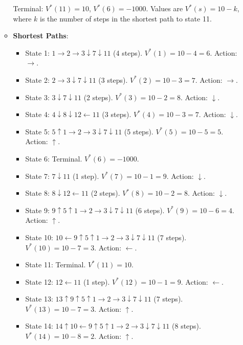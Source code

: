 \documentclass[a3paper,12pt]{extarticle} %
\begin{document}
\begin{enumerate}
\begin{itemize}
\[        \]
        Terminal: \( V^*(11) = 10 \), \( V^*(6) = -1000 \). Values are \( V^*(s) = 10 - k \), where \( k \) is the number of steps in the shortest path to state 11.
        \item \textbf{Shortest Paths}:
        \begin{itemize}
            \item State 1: \( 1 \rightarrow 2 \rightarrow 3 \downarrow 7 \downarrow 11 \) (4 steps). \( V^*(1) = 10 - 4 = 6 \). Action: \( \rightarrow \).
            \item State 2: \( 2 \rightarrow 3 \downarrow 7 \downarrow 11 \) (3 steps). \( V^*(2) = 10 - 3 = 7 \). Action: \( \rightarrow \).
            \item State 3: \( 3 \downarrow 7 \downarrow 11 \) (2 steps). \( V^*(3) = 10 - 2 = 8 \). Action: \( \downarrow \).
            \item State 4: \( 4 \downarrow 8 \downarrow 12 \leftarrow 11 \) (3 steps). \( V^*(4) = 10 - 3 = 7 \). Action: \( \downarrow \).
            \item State 5: \( 5 \uparrow 1 \rightarrow 2 \rightarrow 3 \downarrow 7 \downarrow 11 \) (5 steps). \( V^*(5) = 10 - 5 = 5 \). Action: \( \uparrow \).
            \item State 6: Terminal. \( V^*(6) = -1000 \).
            \item State 7: \( 7 \downarrow 11 \) (1 step). \( V^*(7) = 10 - 1 = 9 \). Action: \( \downarrow \).
            \item State 8: \( 8 \downarrow 12 \leftarrow 11 \) (2 steps). \( V^*(8) = 10 - 2 = 8 \). Action: \( \downarrow \).
            \item State 9: \( 9 \uparrow 5 \uparrow 1 \rightarrow 2 \rightarrow 3 \downarrow 7 \downarrow 11 \) (6 steps). \( V^*(9) = 10 - 6 = 4 \). Action: \( \uparrow \).
            \item State 10: \( 10 \leftarrow 9 \uparrow 5 \uparrow 1 \rightarrow 2 \rightarrow 3 \downarrow 7 \downarrow 11 \) (7 steps). \( V^*(10) = 10 - 7 = 3 \). Action: \( \leftarrow \).
            \item State 11: Terminal. \( V^*(11) = 10 \).
            \item State 12: \( 12 \leftarrow 11 \) (1 step). \( V^*(12) = 10 - 1 = 9 \). Action: \( \leftarrow \).
            \item State 13: \( 13 \uparrow 9 \uparrow 5 \uparrow 1 \rightarrow 2 \rightarrow 3 \downarrow 7 \downarrow 11 \) (7 steps). \( V^*(13) = 10 - 7 = 3 \). Action: \( \uparrow \).
            \item State 14: \( 14 \uparrow 10 \leftarrow 9 \uparrow 5 \uparrow 1 \rightarrow 2 \rightarrow 3 \downarrow 7 \downarrow 11 \) (8 steps). \( V^*(14) = 10 - 8 = 2 \). Action: \( \uparrow \).

\end{itemize}
\end{itemize}
\end{enumerate}
\end{document}
